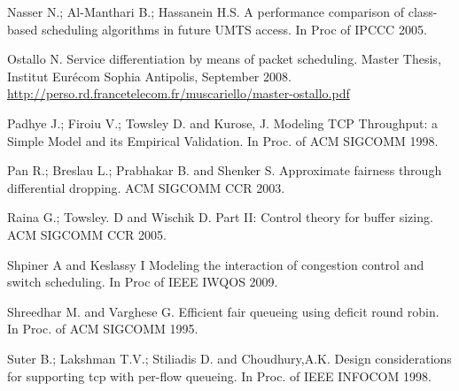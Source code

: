 \documentclass[a4paper,oneside, 11pt]{article}
\begin{document}
Nasser N.;  Al-Manthari B.; Hassanein H.S.
A performance comparison of class-based scheduling algorithms in future UMTS access.
In Proc of IPCCC 2005.

Ostallo N. Service differentiation by means of packet scheduling.
Master Thesis, Institut Eur\'{e}com Sophia Antipolis, September 2008.
\url{http://perso.rd.francetelecom.fr/muscariello/master-ostallo.pdf}

Padhye J.; Firoiu V.; Towsley D. and Kurose, J.
Modeling TCP Throughput: a Simple Model and its Empirical Validation.
In Proc. of ACM SIGCOMM 1998.

Pan R.; Breslau L.; Prabhakar B. and Shenker S.
Approximate fairness through differential dropping.
ACM SIGCOMM CCR 2003.

Raina G.; Towsley. D and  Wischik D.
Part II: Control theory for buffer sizing.
ACM SIGCOMM CCR 2005.

Shpiner A and Keslassy I
Modeling the interaction of congestion control and switch scheduling.
In Proc of IEEE IWQOS 2009.

Shreedhar M. and Varghese G.
Efficient fair queueing using deficit round robin.
In Proc. of ACM SIGCOMM 1995.

Suter B.; Lakshman T.V.; Stiliadis D.  and  Choudhury,A.K.
Design considerations for supporting tcp with per-flow queueing.
In Proc. of IEEE INFOCOM  1998.
\end{document}
